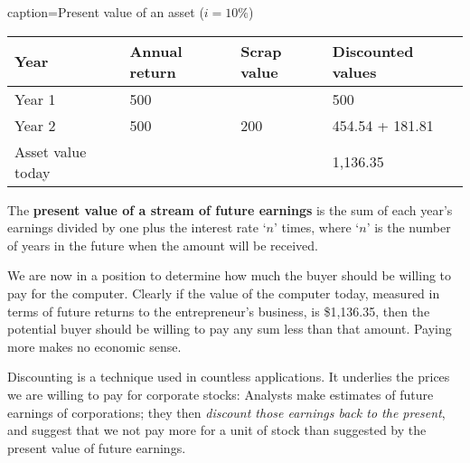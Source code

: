 \begin{Table}{caption={Present value of an asset ($i=10\%$) \label{table:presentvalueasset}}}
\begin{tabu} to \linewidth {|X[1.5,c]X[1,c]X[1,c]X[1.5,c]|} \hline 
		\textbf{Year} & \textbf{Annual return} & \textbf{Scrap value} & \textbf{Discounted values} \\ \hline
							Year 1 & 500 &  & 500 \\ 
		Year 2 & 500 & 200 & 454.54 + 181.81 \\ 
							Asset value today &  &  & 1,136.35 \\  \hline
\end{tabu}
\end{Table}

\begin{DefBox}
The \textbf{present value of a stream of future earnings} is the sum of each year's earnings divided by one plus the interest rate `$n$' times, where `$n$' is the number of years in the future when the amount will be received.
\end{DefBox}

We are now in a position to determine how much the buyer should be willing
to pay for the computer. Clearly if the value of the computer today,
measured in terms of future returns to the entrepreneur's business, is
\$1,136.35, then the potential buyer should be willing to pay any sum less
than that amount. Paying more makes no economic sense.

Discounting is a technique used in countless applications. It underlies the
prices we are willing to pay for corporate stocks: Analysts make estimates
of future earnings of corporations; they then \textit{discount those
earnings back to the present}, and suggest that we not pay more for a unit
of stock than suggested by the present value of future earnings.